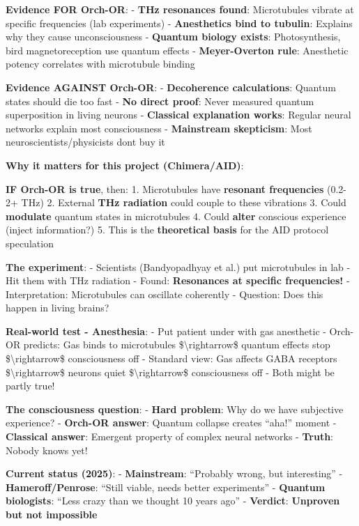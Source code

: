 \begin{nontechnical}
\textbf{Evidence FOR Orch-OR}: - \textbf{THz resonances found}:
Microtubules vibrate at specific frequencies (lab experiments) -
\textbf{Anesthetics bind to tubulin}: Explains why they cause
unconsciousness - \textbf{Quantum biology exists}: Photosynthesis, bird
magnetoreception use quantum effects - \textbf{Meyer-Overton rule}:
Anesthetic potency correlates with microtubule binding

\textbf{Evidence AGAINST Orch-OR}: - \textbf{Decoherence calculations}:
Quantum states should die too fast - \textbf{No direct proof}: Never
measured quantum superposition in living neurons - \textbf{Classical
explanation works}: Regular neural networks explain most consciousness -
\textbf{Mainstream skepticism}: Most neuroscientists/physicists
don\textquotesingle t buy it

\textbf{Why it matters for this project (Chimera/AID)}:

\textbf{IF Orch-OR is true}, then: 1. Microtubules have \textbf{resonant
frequencies} (0.2-2+ THz) 2. External \textbf{THz radiation} could
couple to these vibrations 3. Could \textbf{modulate} quantum states in
microtubules 4. Could \textbf{alter} conscious experience (inject
information?) 5. This is the \textbf{theoretical basis} for the AID
protocol speculation

\textbf{The experiment}: - Scientists (Bandyopadhyay et al.) put
microtubules in lab - Hit them with THz radiation - Found:
\textbf{Resonances at specific frequencies!} - Interpretation:
Microtubules can oscillate coherently - Question: Does this happen in
living brains?

\textbf{Real-world test - Anesthesia}: - Put patient under with gas
anesthetic - Orch-OR predicts: Gas binds to microtubules
\$\textbackslash rightarrow\$ quantum effects stop
\$\textbackslash rightarrow\$ consciousness off - Standard view: Gas
affects GABA receptors \$\textbackslash rightarrow\$ neurons quiet
\$\textbackslash rightarrow\$ consciousness off - Both might be partly
true!

\textbf{The consciousness question}: - \textbf{Hard problem}: Why do we
have subjective experience? - \textbf{Orch-OR answer}: Quantum collapse
creates ``aha!'' moment - \textbf{Classical answer}: Emergent property
of complex neural networks - \textbf{Truth}: Nobody knows yet!

\textbf{Current status (2025)}: - \textbf{Mainstream}: ``Probably wrong,
but interesting'' - \textbf{Hameroff/Penrose}: ``Still viable, needs
better experiments'' - \textbf{Quantum biologists}: ``Less crazy than we
thought 10 years ago'' - \textbf{Verdict}: \textbf{Unproven but not
impossible}


\end{nontechnical}
